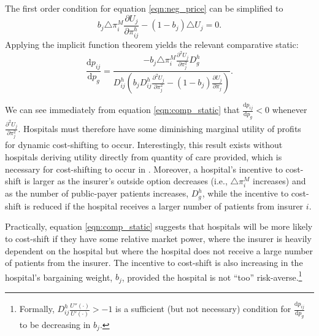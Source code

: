 \documentclass[12pt]{article}
\newcommand{\deriv}[2]{\frac{\mathrm{d}#1}{\mathrm{d}#2}}
\newcommand{\pderiv}[2]{\frac{\partial#1}{\partial#2}}
\begin{document}
The first order condition for equation \ref{eqn:neg_price} can be simplified to
\begin{equation}
 b_{j} \triangle \pi_{i}^{M} \pderiv{U_{j}}{\pi_{ij}^{h}} - (1-b_{j}) \triangle U_{j} = 0.
\label{eqn:price_foc}
\end{equation}
Applying the implicit function theorem yields the relevant comparative static:
\begin{equation}
\deriv{p_{ij}}{p_{g}} = \frac{- b_{j} \triangle \pi_{i}^{M} \pderiv{^{2}U_{j}}{\pi_{j}^{2}}D_{g}^{h}}{D_{ij}^{h}\left(b_{j} D_{ij}^{h} \pderiv{^{2}U_{j}}{\pi_{j}^{2}} - (1-b_{j}) \pderiv{U_{j}}{\pi_{j}} \right)}.
\label{eqn:comp_static}
\end{equation}

We can see immediately from equation \ref{eqn:comp_static} that $\deriv{p_{ij}}{p_{g}}<0$ whenever $\pderiv{^{2}U_{j}}{\pi_{j}^{2}}$. Hospitals must therefore have some diminishing marginal utility of profits for dynamic cost-shifting to occur. Interestingly, this result exists without hospitals deriving utility directly from quantity of care provided, which is necessary for cost-shifting to occur in \cite{dranove1988}. Moreover, a hospital's incentive to cost-shift is larger as the insurer's outside option decreases (i.e., $\triangle \pi_{i}^{M}$ increases) and as the number of public-payer patients increases, $D_{g}^{h}$, while the incentive to cost-shift is reduced if the hospital receives a larger number of patients from insurer $i$.

Practically, equation \ref{eqn:comp_static} suggests that hospitals will be more likely to cost-shift if they have some relative market power, where the insurer is heavily dependent on the hospital but where the hospital does not receive a large number of patients from the insurer. The incentive to cost-shift is also increasing in the hospital's bargaining weight, $b_{j}$, provided the hospital is not ``too'' risk-averse.\footnote{Formally, $D_{ij}^{h}\frac{U''(\cdot)}{U'(\cdot)}>-1$ is a sufficient (but not necessary) condition for $\deriv{p_{ij}}{p_{g}}$ to be decreasing in $b_{j}$.}
\end{document}
